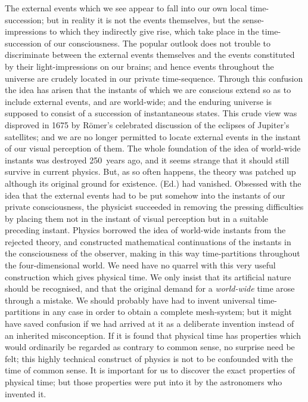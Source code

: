 \documentclass[12pt]{book}
\begin{document}
The external events which we see appear to fall into our own local
time\hyp{}succession; but in reality it is not the events themselves, but the
sense\hyp{}impressions to which they indirectly give rise, which take place in the
time\hyp{}succession of our consciousness. The popular outlook does not trouble to
discriminate between the external events themselves and the events constituted
by their light\hyp{}impressions on our brains; and hence events throughout the
universe are crudely located in our private time\hyp{}sequence. Through this confusion
the idea has arisen that the instants of which we are conscious extend
so as to include external events, and are world-wide; and the enduring universe
is supposed to consist of a succession of instantaneous states. This crude view
was disproved in 1675 by Römer's celebrated discussion of the eclipses of
Jupiter's satellites; and we are no longer permitted to locate external events
in the instant of our visual perception of them. The whole foundation of the
idea of world-wide instants was destroyed 250~years ago, and it seems strange
that it should still survive in current physics. But, as so often happens, the
theory was patched up although its original \footnotemark\footnotetext
   {ground for existence. (Ed.)}
had vanished.
Obsessed with the idea that the external events had to be put somehow into the
instants of our private consciousness, the physicist succeeded in removing
the pressing difficulties by placing them not in the instant of visual perception
but in a suitable preceding instant. Physics borrowed the idea of world-wide
instants from the rejected theory, and constructed mathematical continuations
of the instants in the consciousness of the observer, making in this way time\hyp{}partitions
throughout the four\hyp{}dimensional world. We need have no quarrel
with this very useful construction which gives physical time. We only insist
that its artificial nature should be recognised, and that the original demand
for a \emph{world-wide} time arose through a mistake. We should probably have
had to invent universal time\hyp{}partitions in any case in order to obtain a complete
mesh\hyp{}system; but it might have saved confusion if we had arrived at it
as a deliberate invention instead of an inherited misconception. If it is found
that physical time has properties which would ordinarily be regarded as contrary
to common sense, no surprise need be felt; this highly technical construct
of physics is not to be confounded with the time of common sense. It is important
for us to discover the exact properties of physical time; but those
properties were put into it by the astronomers who invented it.
\end{document}
